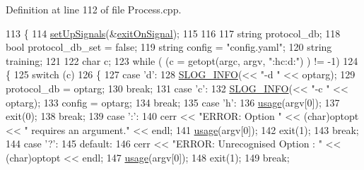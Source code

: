 Definition at line 112 of file Process.\-cpp.


\begin{DoxyCode}
113 \{
114     \hyperlink{class_vsid_netfilter_1_1_process_a39de55e5a688f6eb51aeb446767b2631}{setUpSignals}(&\hyperlink{netfilter_2src_2_process_8cpp_a814b3182732c43ae1880f52e753b6688}{exitOnSignal});
115 
116 
117     \textcolor{keywordtype}{string} protocol\_db;
118     \textcolor{keywordtype}{bool} protocol\_db\_set = \textcolor{keyword}{false};
119     \textcolor{keywordtype}{string} config = \textcolor{stringliteral}{"config.yaml"};
120     \textcolor{keywordtype}{string} training;
121 
122     \textcolor{keywordtype}{char} c;
123     \textcolor{keywordflow}{while} ( (c = getopt(argc, argv, \textcolor{stringliteral}{":hc:d:"}) ) != -1) 
124     \{
125         \textcolor{keywordflow}{switch} (c) 
126         \{
127             \textcolor{keywordflow}{case} \textcolor{charliteral}{'d'}:
128                 \hyperlink{_logger_8h_a119c1c29ba35a8db38e2358e41167282}{SLOG\_INFO}(<< \textcolor{stringliteral}{"-d "} << optarg);
129                 protocol\_db = optarg;
130                 \textcolor{keywordflow}{break};
131             \textcolor{keywordflow}{case} \textcolor{charliteral}{'c'}:
132                 \hyperlink{_logger_8h_a119c1c29ba35a8db38e2358e41167282}{SLOG\_INFO}(<< \textcolor{stringliteral}{"-c "} << optarg);
133                 config = optarg;
134                 \textcolor{keywordflow}{break};
135             \textcolor{keywordflow}{case} \textcolor{charliteral}{'h'}:
136                 \hyperlink{class_vsid_netfilter_1_1_process_a4c6eca4e8b5731e78b13ff8a4f9935d9}{usage}(argv[0]);
137                 exit(0);
138                 \textcolor{keywordflow}{break};
139             \textcolor{keywordflow}{case} \textcolor{charliteral}{':'}:
140                 cerr << \textcolor{stringliteral}{"ERROR: Option "} << (char)optopt << \textcolor{stringliteral}{" requires an argument."} << endl;
141                 \hyperlink{class_vsid_netfilter_1_1_process_a4c6eca4e8b5731e78b13ff8a4f9935d9}{usage}(argv[0]);
142                 exit(1);
143                 \textcolor{keywordflow}{break};
144             \textcolor{keywordflow}{case} \textcolor{charliteral}{'?'}:
145             \textcolor{keywordflow}{default}:
146                 cerr << \textcolor{stringliteral}{"ERROR: Unrecognised Option : "} << (char)optopt << endl;
147                 \hyperlink{class_vsid_netfilter_1_1_process_a4c6eca4e8b5731e78b13ff8a4f9935d9}{usage}(argv[0]);
148                 exit(1);
149                 \textcolor{keywordflow}{break};

\end{DoxyCode}
